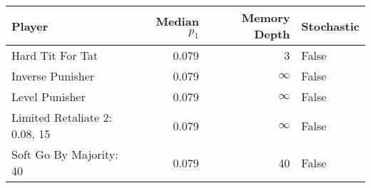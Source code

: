 \begin{tabular}{lrrl}
\toprule
                        Player &  Median $p_1$ &  Memory Depth & Stochastic \\
\midrule
              Hard Tit For Tat &         0.079 &             3 &      False \\
              Inverse Punisher &         0.079 &            \(\infty\) &      False \\
                Level Punisher &         0.079 &            \(\infty\) &      False \\
 Limited Retaliate 2: 0.08, 15 &         0.079 &            \(\infty\) &      False \\
       Soft Go By Majority: 40 &         0.079 &            40 &      False \\
\bottomrule
\end{tabular}
